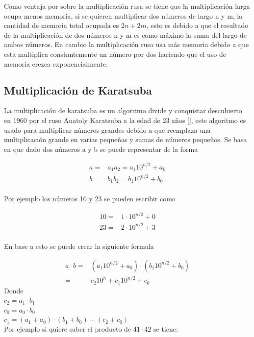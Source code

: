 \documentclass[10pt,journal,compsoc]{IEEEtran}
\begin{document}
Como ventaja por sobre la multiplicación rusa se tiene que la multiplicación larga ocupa menos memoria, si se quieren multiplicar dos números de largo n y m, la cantidad de memoria total ocupada es $2n + 2m$, esto es debido a que el resultado de la multiplicación de dos números n y m es como máximo la suma del largo de ambos números. En cambio la multiplicación rusa usa más memoria debido a que esta multiplica constantemente un número por dos haciendo que el uso de memoria crezca exponencialmente. 

\subsection{Multiplicación de Karatsuba}


La multiplicación de karatsuba es un algoritmo divide y conquistar descubierto en 1960 por el ruso Anatoly Karatsuba a la edad de 23 años [\cite{AL14}], este algoritmo es usado para multiplicar números grandes debido a que reemplaza una multiplicación grande en varias pequeñas y sumas de números pequeños. Se basa en que dado dos números a y b se puede representar de la forma

\begin{align}
a =& a_1 a_2 = a_1 10^{n/2} + a_0\\
b =& b_1 b_2 = b_1 10^{n/2} + b_0\\
\end{align}

Por ejemplo los números 10  y 23 se pueden escribir como

\begin{align}
10 =&  1 \cdot 10^{n/2} + 0\\
23 =&  2 \cdot 10^{n/2} + 3\\
\end{align}

En base a esto se puede crear la siguiente formula


\begin{align}
a\cdot b  =& (a_1 10^{n/2} + a_0) \cdot (b_1 10^{n/2} + b_0) \\
=& c_2 10^n + c_1 10^{n/2} + c_0
\end{align}
Donde\\
$c_2 = a_1 \cdot b_1$\\
$c_0 = a_0 \cdot b_0$\\
$c_1 = (a_1 + a_0) \cdot (b_1 + b_0) - (c_2 + c_0)$\\

Por ejemplo si quiere saber el producto de $41 \cdot 42$ se tiene:
\end{document}
